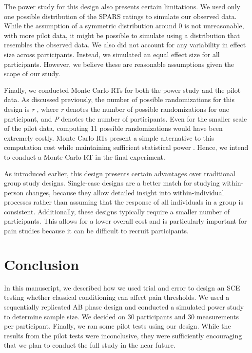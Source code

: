 \documentclass{article}
\begin{document}
The power study for this design also presents certain limitations. We used only one possible distribution of the SPARS ratings to simulate our observed data. While the assumption of a symmetric distribution around 0 is not unreasonable, with more pilot data, it might be possible to simulate using a distribution that resembles the observed data. We also did not account for any variability in effect size across participants. Instead, we simulated an equal effect size for all participants. However, we believe these are reasonable assumptions given the scope of our study. 

Finally, we conducted Monte Carlo RTs for both the power study and the pilot data. As discussed previously, the number of possible randomizations for this design is \emph{r} , where \emph{r} denotes the number of possible randomizations for one participant, and \emph{P} denotes the number of participants. Even for the smaller scale of the pilot data, computing 11  possible randomizations would have been extremely costly. Monte Carlo RTs present a simple alternative to this computation cost while maintaining sufficient statistical power \autocite{bib49,bib50} . Hence, we intend to conduct a Monte Carlo RT in the final experiment. 

As introduced earlier, this design presents certain advantages over traditional group study designs. Single-case designs are a better match for studying within-person changes, because they allow detailed insight into within-individual processes rather than assuming that the response of all individuals in a group is consistent. Additionally, these designs typically require a smaller number of participants. This allows for a lower overall cost and is particularly important for pain studies because it can be difficult to recruit participants.

\section{Conclusion} 

In this manuscript, we described how we used trial and error to design an SCE testing whether classical conditioning can affect pain thresholds. We used a sequentially replicated AB phase design and conducted a simulated power study to determine sample size. We decided on 30 participants and 30 measurements per participant. Finally, we ran some pilot tests using our design. While the results from the pilot tests were inconclusive, they were sufficiently encouraging that we plan to conduct the full study in the near future.
\end{document}

